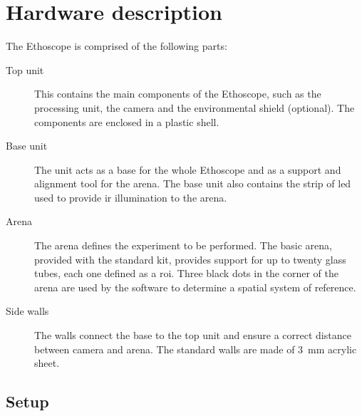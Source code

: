 \chapter{Hardware description}\label{ch:hardware}
The Ethoscope is comprised of the following parts:
\begin{description}
  \item[Top unit] This contains the main components of the Ethoscope, such as the processing unit, the camera and the environmental shield (optional). The components are enclosed in a plastic shell.
  \item[Base unit] The unit acts as a base for the whole Ethoscope and as a support and alignment tool for the arena. The base unit also contains the strip of \gls{led} used to provide \gls{ir} illumination to the arena.
  \item[Arena] The arena defines the experiment to be performed. The basic arena, provided with the standard kit, provides support for up to twenty glass tubes, each one defined as a \gls{roi}. Three black dots in the corner of the arena are used by the software to determine a spatial system of reference.
  \item[Side walls] The walls connect the base to the top unit and ensure a correct distance between camera and arena. The standard walls are made of 3~mm acrylic sheet.
\end{description}

\section{Setup}\label{ch:setup}
 